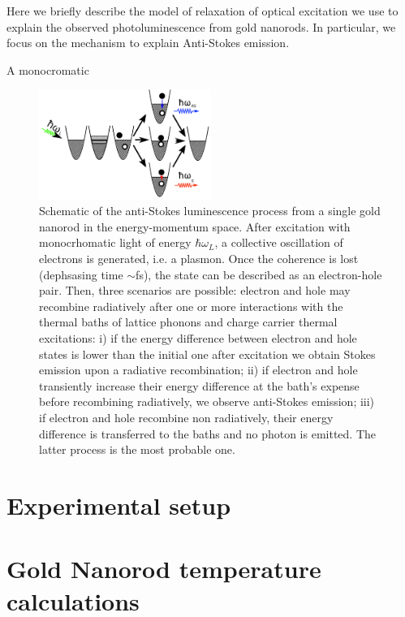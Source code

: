 \documentclass[journal=nalefd,manuscript=letter]{achemso}
\begin{document}
Here we briefly describe the model of relaxation of optical excitation we use to explain the  
observed photoluminescence from gold nanorods. In particular, we focus on the 
mechanism to explain Anti-Stokes emission.

A monocromatic 



\begin{figure}[htp] \centering
\includegraphics[width=0.5\textwidth]{Figures/Supplementary/AS_Scheme/luminescence_all_AS.png}
\caption{Schematic of the anti-Stokes luminescence process from a single gold
nanorod in the energy-momentum space. 
After excitation with monocrhomatic light of energy $\hbar \omega_L$, 
a collective oscillation of electrons is generated, i.e. a plasmon. 
Once the coherence is lost (dephsasing time $\sim$fs), the state can be described as an
electron-hole pair. Then, three scenarios are possible: electron and hole may
recombine radiatively after one or more interactions with the thermal baths of
lattice phonons and charge carrier thermal excitations: i) if the energy
difference between electron and hole states is lower than the initial one after
excitation we obtain Stokes emission upon a radiative recombination; ii) if
electron and hole transiently increase their energy difference at the bath's
expense before recombining radiatively, we observe anti-Stokes emission; iii) if
electron and hole recombine non radiatively, their energy difference is
transferred to the baths and no photon is emitted. The latter process is the
most probable one.}
	\label{fig:anti-Stokes-process}
\end{figure}


\section{Experimental setup}\label{sec:setup}




\section{Gold Nanorod temperature calculations} \label{sec:temp-calc}
\end{document}
